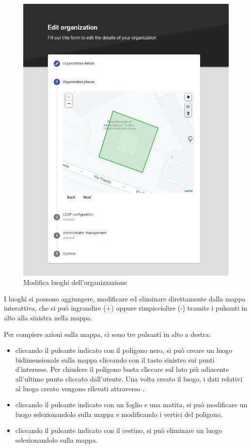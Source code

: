 \documentclass[../manuale-utente.tex]{subfiles}
\begin{document}
\begin{enumerate}
    \begin{figure}[H]
        \centering
        \includegraphics[width=120mm]{img/web-app/edit-organization/2-luoghi-organizzazione.png}
        \caption{Modifica luoghi dell'organizzazione}%
        \label{fig:web_app_modifica_luoghi_organizzazione}
    \end{figure}
    
    I luoghi si possono aggiungere, modificare ed eliminare direttamente dalla mappa interattiva, che si può ingrandire (+) oppure rimpicciolire (-) tramite i pulsanti in alto alla sinistra nella mappa.

    Per compiere azioni sulla mappa, ci sono tre pulsanti in alto a destra:
    \begin{itemize}
        \item cliccando il pulsante indicato con il poligono nero, si può creare un luogo bidimensionale sulla mappa cliccando con il tasto sinistro sui punti d'interesse. Per chiudere il poligono basta cliccare sul lato più adiacente all'ultimo punto cliccato dall'utente. Una volta creato il luogo, i dati relativi al luogo creato vengono rilevati attraverso .
        \item cliccando il pulsante indicato con un foglio e una matita, si può modificare un luogo selezionandolo sulla mappa e modificando i vertici del poligono.
        \item cliccando il pulsante indicato con il cestino, si può eliminare un luogo selezionandolo sulla mappa.
    \end{itemize}


\end{enumerate}
\end{document}
